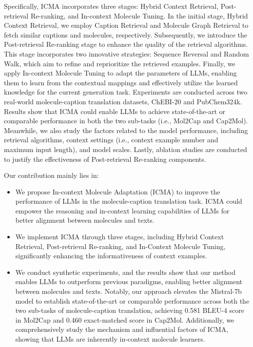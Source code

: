 Specifically, ICMA incorporates three stages: Hybrid Context Retrieval, Post-retrieval Re-ranking, and In-context Molecule Tuning.
In the initial stage, Hybrid Context Retrieval, we employ Caption Retrieval and Molecule Graph Retrieval to fetch similar captions and molecules, respectively.
Subsequently, we introduce the Post-retrieval Re-ranking stage to enhance the quality of the retrieval algorithms. This stage incorporates two innovative strategies: Sequence Reversal and Random Walk, which aim to refine and reprioritize the retrieved examples.
Finally, we apply In-context Molecule Tuning to adapt the parameters of LLMs, enabling them to learn from the contextual mappings and effectively utilize the learned knowledge for the current generation task.
Experiments are conducted across two real-world molecule-caption translation datasets, ChEBI-20 and PubChem324k. Results show that ICMA could enable LLMs to achieve state-of-the-art or comparable performance in both the two sub-tasks (i.e., Mol2Cap and Cap2Mol). Meanwhile, we also study the factors related to the model performance, including retrieval algorithms, context settings (i.e., context example number and maximum input length), and model scales. Lastly, ablation studies are conducted to justify the effectiveness of Post-retrieval Re-ranking components.

Our contribution mainly lies in:
\begin{itemize}
    \item We propose In-context Molecule Adaptation (ICMA) to improve the performance of LLMs in the molecule-caption translation task. ICMA could empower the reasoning and in-context learning capabilities of LLMs for better alignment between molecules and texts.
    \item We implement ICMA through three stages, including Hybrid Context Retrieval, Post-retrieval Re-ranking, and In-Context Molecule Tuning, significantly enhancing the informativeness of context examples.
    \item We conduct synthetic experiments, and the results show that our method enables LLMs to outperform previous paradigms, enabling better alignment between molecules and texts. Notably, our approach elevates the Mistral-7b model to establish state-of-the-art or comparable performance across both the two sub-tasks of molecule-caption translation, achieving 0.581 BLEU-4 score in Mol2Cap and 0.460 exact-matched score in Cap2Mol. Additionally, we comprehensively study the mechanism and influential factors of ICMA, showing that LLMs are inherently in-context molecule learners.
\end{itemize}

